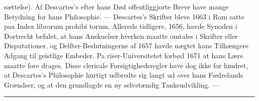 \documentclass[12pt,a4paper]{book}
\newcommand{\divrule}{\begin{center}\rule{2cm}{0.4pt}\end{center}}
\begin{document}
sættelse). Af Descartes's efter hans Død offentliggjorte Breve
have mange Betydning for hans Philosophie. --- Descartes's
Skrifter bleve 1663 i Rom satte paa Index librorum prohibi\-%
torum. Allerede tidligere, 1656, havde Synoden i Dortrecht
befalet, at hans Anskuelser hverken maatte omtales i Skrifter
eller Disputationer, og Delfter-Beslutningerne af 1657 havde
nægtet hans Tilhængere Adgang til geistlige Embeder. Pa\-%
riser-Universitetet forbød 1671 at hans Lære maatte fore\-%
drages. Disse clericale Forsigtighedsregler have dog ikke for\-%
hindret, at Descartes's Philosophie hurtigt udbredte sig langt
ud over hans Fædrelands Grændser, og at den grundlagde en
ny selvstændig Tankeudvikling. ---

\divrule
\end{document}
